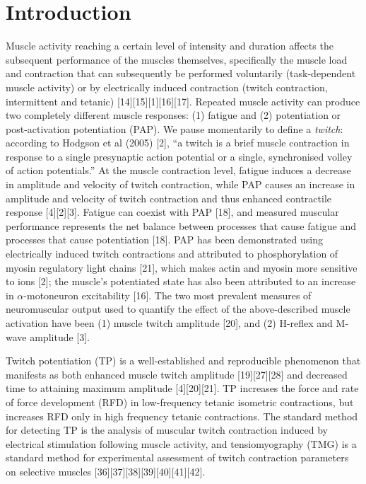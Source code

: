 \documentclass[utf8]{style/FrontiersinHarvard}
\begin{document}
\section{Introduction}
Muscle activity reaching a certain level of intensity and duration affects the subsequent performance of the muscles themselves,
specifically the muscle load and contraction that can subsequently be performed voluntarily (task-dependent muscle activity) or by electrically induced contraction (twitch contraction, intermittent and tetanic) [14][15][1][16][17].
Repeated muscle activity can produce two completely different muscle responses: (1) fatigue and (2) potentiation or post-activation potentiation (PAP). 
We pause momentarily to define a \textit{twitch}:
according to Hodgson et al (2005) [2], ``a twitch is a brief muscle contraction in response to a single presynaptic action potential or a single, synchronised volley of action potentials.''
At the muscle contraction level, fatigue induces a decrease in amplitude and velocity of twitch contraction, while PAP causes an increase in amplitude and velocity of twitch contraction and thus enhanced contractile response [4][2][3].
Fatigue can coexist with PAP [18], and measured muscular performance represents the net balance between processes that cause fatigue and processes that cause potentiation [18].
PAP has been demonstrated using electrically induced twitch contractions and attributed to phosphorylation of myosin regulatory light chains [21], which makes actin and myosin more sensitive to  ions [2];
the muscle's potentiated state has also been attributed to an increase in $ \alpha $-motoneuron excitability [16].
The two most prevalent measures of neuromuscular output used to quantify the effect of the above-described muscle activation have been (1) muscle twitch amplitude [20], and (2) H-reflex and M-wave amplitude [3].

Twitch potentiation (TP) is a well-established and reproducible phenomenon that manifests as both enhanced muscle twitch amplitude [19][27][28] and decreased time to attaining maximum amplitude [4][20][21].
TP increases the force and rate of force development (RFD) in low-frequency tetanic isometric contractions, but increases RFD only in high frequency tetanic contractions.
The standard method for detecting TP is the analysis of muscular twitch contraction induced by electrical stimulation following muscle activity,
and tensiomyography (TMG) is a standard method for experimental assessment of twitch contraction parameters on selective muscles [36][37][38][39][40][41][42].
\end{document}
